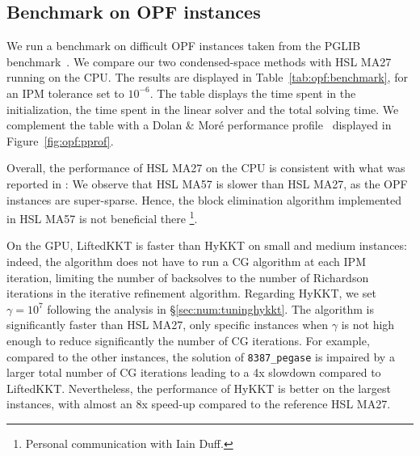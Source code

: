 \subsection{Benchmark on OPF instances}
\label{sec:num:opf}
We run a benchmark on difficult OPF instances taken
from the PGLIB benchmark~\cite{babaeinejadsarookolaee2019power}.
We compare our two condensed-space methods with HSL MA27 running
on the CPU. The results are displayed in Table~\ref{tab:opf:benchmark},
for an IPM tolerance set to $10^{-6}$. The table displays the
time spent in the initialization, the time spent in the linear solver and the total
solving time.
We complement the table with a Dolan \& Moré performance profile~\cite{dolan2002benchmarking} displayed
in Figure~\ref{fig:opf:pprof}.

Overall, the performance of HSL MA27 on the CPU is consistent with what was reported
in \cite{babaeinejadsarookolaee2019power}: We observe that HSL MA57 is slower
than HSL MA27, as the OPF instances are super-sparse.
Hence, the block elimination algorithm implemented in HSL MA57 is not beneficial there
\footnote{Personal communication with Iain Duff.}.

On the GPU, LiftedKKT is faster than HyKKT on small and medium instances: indeed, the algorithm
does not have to run a CG algorithm at each IPM iteration, limiting the number
of backsolves to the number of Richardson iterations in the iterative refinement
algorithm.
Regarding HyKKT, we set $\gamma = 10^7$ following the analysis in \S\ref{sec:num:tuninghykkt}.
The algorithm is significantly faster than HSL MA27, only specific
instances when $\gamma$ is not high enough to reduce significantly the number
of CG iterations. For example, compared
to the other instances, the solution of {\tt 8387\_pegase} is impaired
by a larger total number of CG iterations leading to a 4x slowdown compared to LiftedKKT.
Nevertheless, the performance of HyKKT is better on the largest instances,
with almost an 8x speed-up compared to the reference HSL MA27.

